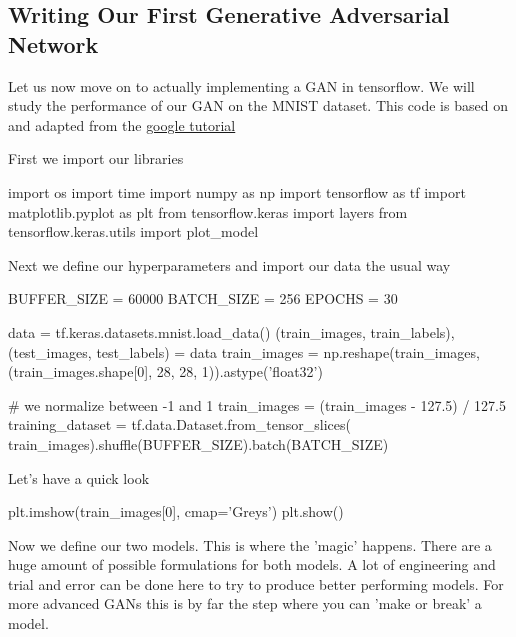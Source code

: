 \documentclass[%
oneside,                 %
final,                   %
10pt]{article}
\begin{document}
\subsection{Writing Our First Generative Adversarial Network}
Let us now move on to actually implementing a GAN in tensorflow. We will study
the performance of our GAN on the MNIST dataset. This code is based on and
adapted from the
\href{{https://www.tensorflow.org/tutorials/generative/dcgan}}{google tutorial}

First we import our libraries









\bpycod
import os
import time
import numpy as np
import tensorflow as tf
import matplotlib.pyplot as plt
from tensorflow.keras import layers
from tensorflow.keras.utils import plot_model

\epycod


Next we define our hyperparameters and import our data the usual way

















\bpycod
BUFFER_SIZE = 60000
BATCH_SIZE = 256
EPOCHS = 30

data = tf.keras.datasets.mnist.load_data()
(train_images, train_labels), (test_images, test_labels) = data
train_images = np.reshape(train_images, (train_images.shape[0],
                                         28,
                                         28,
                                         1)).astype('float32')

# we normalize between -1 and 1
train_images = (train_images - 127.5) / 127.5
training_dataset = tf.data.Dataset.from_tensor_slices(
                      train_images).shuffle(BUFFER_SIZE).batch(BATCH_SIZE)

\epycod


Let's have a quick look




\bpycod
plt.imshow(train_images[0], cmap='Greys')
plt.show()

\epycod


Now we define our two models. This is where the 'magic' happens. There are a
huge amount of possible formulations for both models. A lot of engineering and
trial and error can be done here to try to produce better performing models. For
more advanced GANs this is by far the step where you can 'make or break' a
model.
\end{document}
